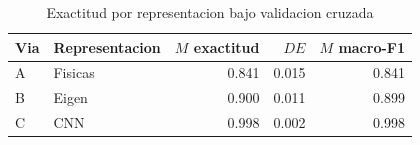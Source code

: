 \begin{table}[htbp]
\caption{Exactitud por representacion bajo validacion cruzada}
\label{tab:resultados-via}
\begin{tabular}{llrrr}
\toprule
Via & Representacion & $M$ exactitud & $DE$ & $M$ macro-F1 \\
\midrule
A & Fisicas & 0.841 & 0.015 & 0.841 \\
B & Eigen & 0.900 & 0.011 & 0.899 \\
C & CNN & 0.998 & 0.002 & 0.998 \\
\bottomrule
\end{tabular}
\end{table}

